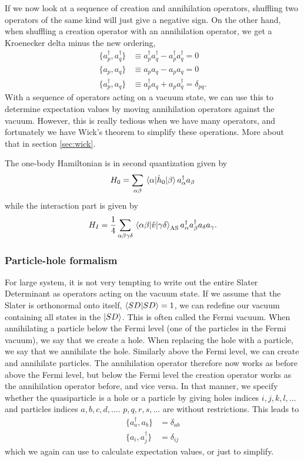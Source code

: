 If we now look at a sequence of creation and annihilation operators, shuffling two operators of the same kind will just give a negative sign. On the other hand, when shuffling a creation operator with an annihilation operator, we get a Kroenecker delta minus the new ordering,
\begin{align}
	\{a_p^{\dagger},a_q^{\dagger}\}&\equiv a_p^{\dagger}a_q^{\dagger}-a_p^{\dagger}a_q^{\dagger}=0\\
	\{a_p,a_q\}&\equiv a_pa_q-a_pa_q=0\\
	\{a_p^{\dagger},a_q\}&\equiv a_p^{\dagger}a_q+a_pa_q^{\dagger}=\delta_{pq}.
\end{align}
With a sequence of operators acting on a vacuum state, we can use this to determine expectation values by moving annihilation operators against the vacuum. However, this is really tedious when we have many operators, and fortunately we have Wick's theorem to simplify these operations. More about that in section \eqref{sec:wick}.

The one-body Hamiltonian is in second quantization given by
\begin{equation}
	H_0=\sum_{\alpha\beta}\mel{\alpha}{\hat{h}_0}{\beta}a_{\alpha}^{\dagger}a_{\beta}
\end{equation}
while the interaction part is given by
\begin{equation}
	H_I=\frac{1}{4}\sum_{\alpha\beta\gamma\delta}\mel{\alpha\beta}{\hat{v}}{\gamma\delta}_{\text{AS}}a_{\alpha}^{\dagger}a_{\beta}^{\dagger}a_{\delta}a_{\gamma}.
\end{equation}

\subsubsection{Particle-hole formalism}
For large system, it is not very tempting to write out the entire Slater Determinant as operators acting on the vacuum state. If we assume that the Slater is orthonormal onto itself, $\braket{SD}{SD}=1$, we can redefine our vacuum containing all states in the $\ket{SD}$. This is often called the Fermi vacuum. When annihilating a particle below the Fermi level (one of the particles in the Fermi vacuum), we say that we create a hole. When replacing the hole with a particle, we say that we annihilate the hole. Similarly above the Fermi level, we can create and annihilate particles. The annihilation operator therefore now works as before above the Fermi level, but below the Fermi level the creation operator works as the annihilation operator before, and vice versa. In that manner, we specify whether the quasiparticle is a hole or a particle by giving holes indices $i,j,k,l,\hdots$ and particles indices $a,b,c,d,\hdots$. $p,q,r,s,\hdots$ are without restrictions. This leads to
\begin{align}
	\{a_a^{\dagger},a_b\}&=\delta_{ab}\\
	\{a_i,a_j^{\dagger}\}&=\delta_{ij}
\end{align}
which we again can use to calculate expectation values, or just to simplify. 


